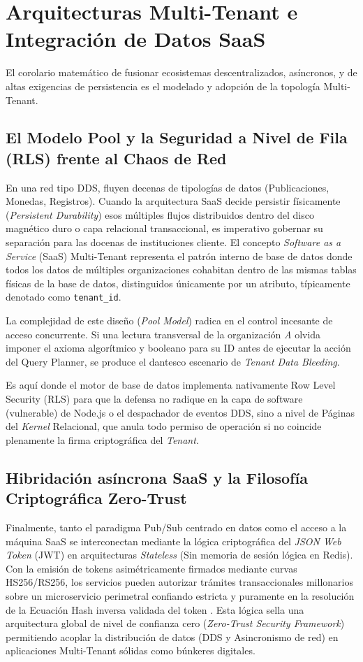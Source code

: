 \documentclass[11pt,a4paper,oneside]{report}
\begin{document}
\section{Arquitecturas Multi-Tenant e Integraci\'on de Datos SaaS}

El corolario matem\'atico de fusionar ecosistemas descentralizados, as\'incronos, y de altas exigencias de persistencia es el modelado y adopci\'on de la topolog\'ia Multi-Tenant. 

\subsection{El Modelo Pool y la Seguridad a Nivel de Fila (RLS) frente al Chaos de Red}
En una red tipo DDS, fluyen decenas de tipolog\'ias de datos (Publicaciones, Monedas, Registros). Cuando la arquitectura SaaS decide persistir f\'isicamente (\textit{Persistent Durability}) esos m\'ultiples flujos distribuidos dentro del disco magn\'etico duro o capa relacional transaccional, es imperativo gobernar su separaci\'on para las docenas de instituciones cliente. 
El concepto \textit{Software as a Service} (SaaS) Multi-Tenant representa el patr\'on interno de base de datos donde todos los datos de m\'ultiples organizaciones cohabitan dentro de las mismas tablas f\'isicas de la base de datos, distinguidos \'unicamente por un atributo, t\'ipicamente denotado como \texttt{tenant\_id}. 

La complejidad de este dise\~no (\textit{Pool Model}) radica en el control incesante de acceso concurrente. Si una lectura transversal de la organizaci\'on \textit{A} olvida imponer el axioma algor\'itmico y booleano para su ID antes de ejecutar la acci\'on del Query Planner, se produce el dantesco escenario de \textit{Tenant Data Bleeding}.

Es aqu\'i donde el motor de base de datos implementa nativamente Row Level Security (RLS) para que la defensa no radique en la capa de software (vulnerable) de Node.js o el despachador de eventos DDS, sino a nivel de P\'aginas del \textit{Kernel} Relacional, que anula todo permiso de operaci\'on si no coincide plenamente la firma criptogr\'afica del \textit{Tenant}.

\subsection{Hibridaci\'on as\'incrona SaaS y la Filosof\'ia Criptogr\'afica Zero-Trust}
Finalmente, tanto el paradigma Pub/Sub centrado en datos como el acceso a la m\'aquina SaaS se interconectan mediante la l\'ogica criptogr\'afica del \textit{JSON Web Token} (JWT) en arquitecturas \textit{Stateless} (Sin memoria de sesi\'on l\'ogica en Redis). Con la emisi\'on de tokens asim\'etricamente firmados mediante curvas HS256/RS256, los servicios pueden autorizar tr\'amites transaccionales millonarios sobre un microservicio perimetral confiando estricta y puramente en la resoluci\'on de la Ecuaci\'on Hash inversa validada del token \citep{laudon2020}. Esta l\'ogica sella una arquitectura global de nivel de confianza cero (\textit{Zero-Trust Security Framework}) permitiendo acoplar la distribuci\'on de datos (DDS y Asincronismo de red) en aplicaciones Multi-Tenant s\'olidas como b\'unkeres digitales.
\end{document}
